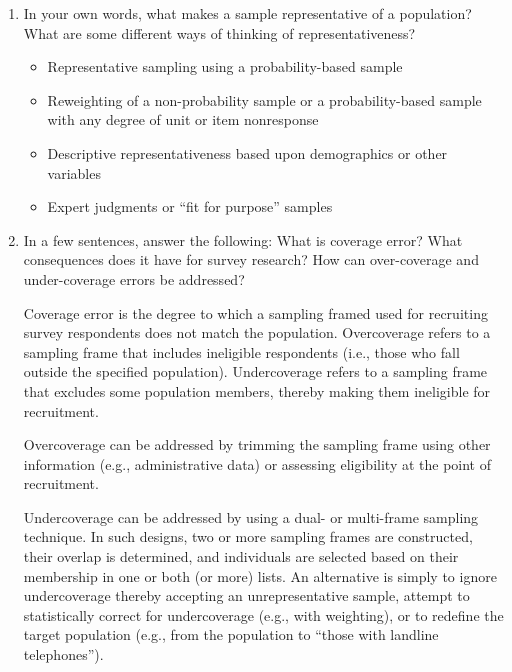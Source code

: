 \documentclass[a4paper]{exam}
\begin{document}
\begin{enumerate}
\item In your own words, what makes a sample representative of a population? What are some different ways of thinking of representativeness?

\begin{solution}

\begin{itemize}
\item Representative sampling using a probability-based sample
\item Reweighting of a non-probability sample or a probability-based sample with any degree of unit or item nonresponse
\item Descriptive representativeness based upon demographics or other variables
\item Expert judgments or ``fit for purpose'' samples
\end{itemize}

\end{solution}

\item In a few sentences, answer the following: What is coverage error? What consequences does it have for survey research? How can over-coverage and under-coverage errors be addressed?

\begin{solution}

Coverage error is the degree to which a sampling framed used for recruiting survey respondents does not match the population. Overcoverage refers to a sampling frame that includes ineligible respondents (i.e., those who fall outside the specified population). Undercoverage refers to a sampling frame that excludes some population members, thereby making them ineligible for recruitment.

Overcoverage can be addressed by trimming the sampling frame using other information (e.g., administrative data) or assessing eligibility at the point of recruitment.

Undercoverage can be addressed by using a dual- or multi-frame sampling technique. In such designs, two or more sampling frames are constructed, their overlap is determined, and individuals are selected based on their membership in one or both (or more) lists. An alternative is simply to ignore undercoverage thereby accepting an unrepresentative sample, attempt to statistically correct for undercoverage (e.g., with weighting), or to redefine the target population (e.g., from the population to ``those with landline telephones'').


\end{solution}
\end{enumerate}
\end{document}
